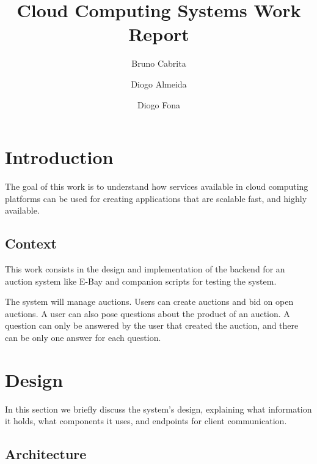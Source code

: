 \documentclass[runningheads]{llncs}
\begin{document}
%
\title{Cloud Computing Systems Work Report}
%
%
\author{Bruno Cabrita \and
Diogo Almeida \and
Diogo Fona}
%
%
%
\maketitle %
%
%
\section{Introduction}
The goal of this work is to understand how services available in cloud computing platforms can be used for creating applications that are scalable fast, and highly available.

\subsection{Context}
This work consists in the design and implementation of the backend for an auction system like E-Bay and companion scripts for testing the system.

The system will manage auctions. Users can create auctions and bid on open auctions. A user can also pose questions about the product of an auction. A question can only be answered by the user that created the auction, and there can be only one answer for each question.


\section{Design}

In this section we briefly discuss the system's design, explaining what information it holds, what components it uses, and endpoints for client communication.

\subsection{Architecture}
\end{document}

